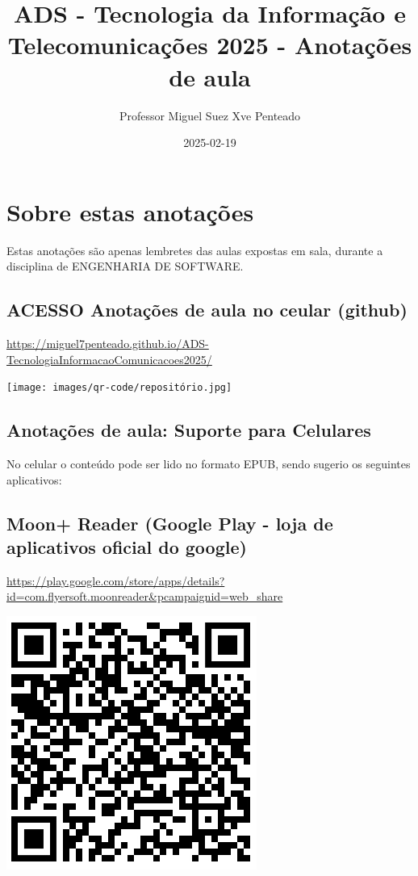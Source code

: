 \documentclass[
]{book}
\title{ADS - Tecnologia da Informação e Telecomunicações 2025 - Anotações de aula}
\author{Professor Miguel Suez Xve Penteado}
\date{2025-02-19}
\begin{document}
\maketitle

{
\setcounter{tocdepth}{1}
\tableofcontents
}
\chapter*{Sobre estas anotações}\label{sobre-estas-anotauxe7uxf5es}

Estas anotações são apenas lembretes das aulas expostas em sala, durante a disciplina de ENGENHARIA DE SOFTWARE.

\section{ACESSO Anotações de aula no ceular (github)}\label{acesso-anotauxe7uxf5es-de-aula-no-ceular-github}

\url{https://miguel7penteado.github.io/ADS-TecnologiaInformacaoComunicacoes2025/}

\texttt{[image: images/qr-code/repositório.jpg]}

\section{Anotações de aula: Suporte para Celulares}\label{anotauxe7uxf5es-de-aula-suporte-para-celulares}

No celular o conteúdo pode ser lido no formato EPUB, sendo sugerio os seguintes aplicativos:

\section{\texorpdfstring{\textbf{Moon+ Reader (Google Play - loja de aplicativos oficial do google)}}{Moon+ Reader (Google Play - loja de aplicativos oficial do google)}}\label{moon-reader-google-play---loja-de-aplicativos-oficial-do-google}

\url{https://play.google.com/store/apps/details?id=com.flyersoft.moonreader&pcampaignid=web_share}

\includegraphics{images/qr-code/leitor_ebook/MoonReaderPlus.jpg}
\end{document}
